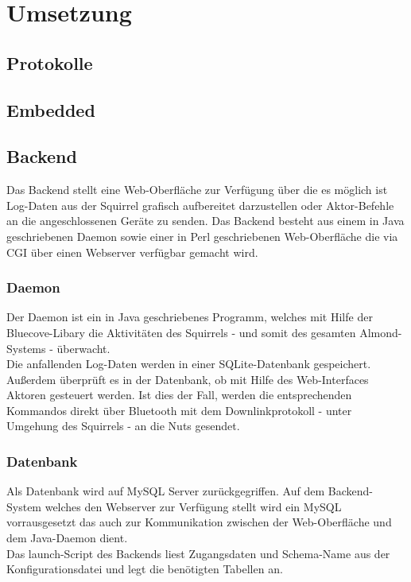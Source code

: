 \documentclass[12pt,a4paper]{article}
\begin{document}
\section{Umsetzung}
\subsection{Protokolle}
\subsection{Embedded}
\subsection{Backend}
Das Backend stellt eine Web-Oberfläche zur Verfügung über die es möglich ist Log-Daten aus der Squirrel grafisch aufbereitet darzustellen oder Aktor-Befehle an die angeschlossenen Geräte zu senden. Das Backend besteht aus einem in Java geschriebenen Daemon sowie einer in Perl geschriebenen Web-Oberfläche die via CGI über einen Webserver verfügbar gemacht wird.

\subsubsection{Daemon}
Der Daemon ist ein in Java geschriebenes Programm, welches mit Hilfe der Bluecove-Libary die Aktivitäten des Squirrels - und somit des gesamten Almond-Systems - überwacht.\\
Die anfallenden Log-Daten werden in einer SQLite-Datenbank gespeichert.\\
Außerdem überprüft es in der Datenbank, ob mit Hilfe des Web-Interfaces Aktoren gesteuert werden. Ist dies der Fall, werden die entsprechenden Kommandos direkt über Bluetooth mit dem Downlinkprotokoll - unter Umgehung des Squirrels - an die Nuts gesendet.\\

\subsubsection{Datenbank}
Als Datenbank wird auf MySQL Server zurückgegriffen. Auf dem Backend-System welches den Webserver zur Verfügung stellt wird ein MySQL vorrausgesetzt das auch zur Kommunikation zwischen der Web-Oberfläche und dem Java-Daemon dient. \\
Das launch-Script des Backends liest Zugangsdaten und Schema-Name aus der Konfigurationsdatei und legt die benötigten Tabellen an.
\end{document}
